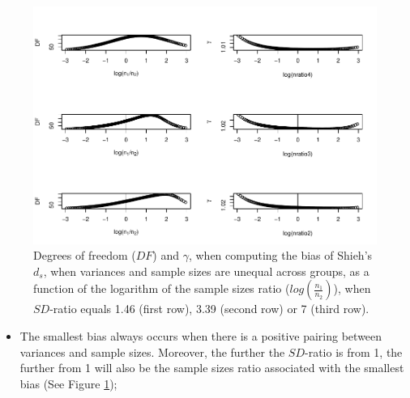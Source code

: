 \documentclass[
  english,
  man]{apa6}
\providecommand{\tightlist}{%
  \setlength{\itemsep}{0pt}\setlength{\parskip}{0pt}}
\begin{document}
\begin{figure}
\centering
\includegraphics{Theoretical-Bias-of-all-estimators-as-a-function-of-population-parameters_files/figure-latex/biasshiehhetunbaldfandvar-1.pdf}
\caption{\label{fig:biasshiehhetunbaldfandvar}Degrees of freedom (\(DF\)) and \(\gamma\), when computing the bias of Shieh's \(d_s\), when variances and sample sizes are unequal across groups, as a function of the logarithm of the sample sizes ratio (\(log \left( \frac{n_1}{n_2} \right)\)), when \(SD\)-ratio equals 1.46 (first row), 3.39 (second row) or 7 (third row).}
\end{figure}

\begin{itemize}
\tightlist
\item
  The smallest bias always occurs when there is a positive pairing between variances and sample sizes. Moreover, the further the \(SD\)-ratio is from 1, the further from 1 will also be the sample sizes ratio associated with the smallest bias (See Figure \ref{fig:biasshiehhetunbaldfandvar});
\end{itemize}
\end{document}
